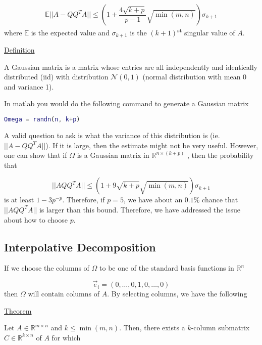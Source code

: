 \begin{equation*}
    \mathbb{E} || A - QQ^TA || \leq \left( 1 + \frac{4\sqrt{k+p}}{p-1}
    \sqrt{\min (m, n)}
    \right) \sigma_{k+1}
\end{equation*}
where $\mathbb{E}$ is the expected value and $\sigma_{k+1}$ is the $(k+1)$\textsuperscript{st} singular value of $A$.


\underline{Definition}

A Gaussian matrix is a matrix whose entries are all independently and identically distributed (iid) with distribution $\mathcal{N}(0, 1)$ (normal distribution with mean 0 and variance 1).

{\color{red}
In matlab you would do the following command to generate a Gaussian matrix

\begin{lstlisting}[language=Matlab]
Omega = randn(n, k+p)
\end{lstlisting}
}

A valid question to ask is what the variance of this distribution is (ie.\ $||A-QQ^TA||$). If it is large, then the estimate might not be very useful. However, one can show that if $\Omega$ is a Gaussian matrix in $\mathbb{R}^{n\times (k+p)}$
, then the probability that

\begin{equation*}
    ||AQQ^TA||\leq \left(1 + 9\sqrt{k+p}\sqrt{\min (m, n)}\right)\sigma_{k+1}
\end{equation*}
is at least $1-3p^{-p}$. Therefore, if $p=5$, we have about an $0.1\%$ chance that $||AQQ^TA||$ is larger than this bound. Therefore, we have addressed the issue about how to choose $p$.

\subsection{Interpolative Decomposition}

If we choose the columns of $\Omega$ to be one of the standard basis functions in $\mathbb{R}^n$

\begin{equation*}
    \vec{e}_i = (0, \ldots, 0, 1, 0, \ldots, 0)
\end{equation*}
then $\Omega$ will contain columns of $A$. By selecting columns, we have the following

\underline{Theorem}

Let $A\in\mathbb{R}^{m\times n}$ and $k\leq \min (m,n)$. Then, there exists a $k$-column submatrix $C\in\mathbb{R}^{k\times n}$ of $A$ for which

